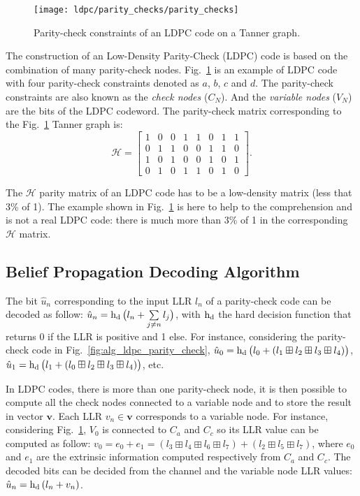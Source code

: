 \begin{figure}[htp]
  \centering
  \texttt{[image: ldpc/parity\_checks/parity\_checks]}
  \caption{Parity-check constraints of an LDPC code on a Tanner graph.}
  \label{fig:alg_ldpc_parity_checks}
\end{figure}

The construction of an Low-Density Parity-Check (LDPC) code is based on the
combination of many parity-check nodes. Fig.~\ref{fig:alg_ldpc_parity_checks} is
an example of LDPC code with four parity-check constraints denoted as $a$, $b$,
$c$ and $d$. The parity-check constraints are also known as the \emph{check
nodes} ($C_N$). And the \emph{variable nodes} ($V_N$) are the bits of the LDPC
codeword. The parity-check matrix corresponding to the
Fig.~\ref{fig:alg_ldpc_parity_checks} Tanner graph is:
\begin{equation*}
\bm{\mathcal{H}} =
\begin{bmatrix}
  1 & 0 & 0 & 1 & 1 & 0 & 1 & 1\\
  0 & 1 & 1 & 0 & 0 & 1 & 1 & 0\\
  1 & 0 & 1 & 0 & 0 & 1 & 0 & 1\\
  0 & 1 & 0 & 1 & 1 & 0 & 1 & 0
\end{bmatrix}.
\end{equation*}

The $\bm{\mathcal{H}}$ parity matrix of an LDPC code has to be a low-density
matrix (less that 3\% of 1). The example shown in
Fig.~\ref{fig:alg_ldpc_parity_checks} is here to help to the comprehension and
is not a real LDPC code: there is much more than 3\% of 1 in the corresponding
$\bm{\mathcal{H}}$ matrix.

\subsection{Belief Propagation Decoding Algorithm}

The bit $\hat{u}_n$ corresponding to the input LLR $l_n$ of a parity-check code
can be decoded as follow: $\hat{u}_n = \operatorname{h_d}\big(l_n +
\sum\limits_{j \neq n}{l_j}\big)$, with $\operatorname{h_d}$ the hard decision function
that returns 0 if the LLR is positive and 1 else. For instance, considering the
parity-check code in Fig.~\ref{fig:alg_ldpc_parity_check}, $\hat{u}_0 =
\operatorname{h_d}\big(l_0 + (l_1 \boxplus l_2 \boxplus l_3 \boxplus l_4)\big)$,
$\hat{u}_1 = \operatorname{h_d}\big(l_1 + (l_0 \boxplus l_2 \boxplus l_3 \boxplus
l_4)\big)$, etc.

In LDPC codes, there is more than one parity-check node, it is then possible to
compute all the check nodes connected to a variable node and to store the result
in vector $\bm{v}$. Each LLR $v_n \in \bm{v}$ corresponds to a variable node.
For instance, considering Fig.~\ref{fig:alg_ldpc_parity_checks}, $V_0$ is
connected to $C_a$ and $C_c$ so its LLR value can be computed as follow: $v_0
= e_0 + e_1 = (l_3 \boxplus l_4 \boxplus l_6 \boxplus l_7) + (l_2 \boxplus l_5
\boxplus l_7)$, where $e_0$ and $e_1$ are the extrinsic information computed
respectively from $C_a$ and $C_c$. The decoded bits can be decided from the
channel and the variable node LLR values: $\hat{u}_n = \operatorname{h_d}{(l_n + v_n)}$.

